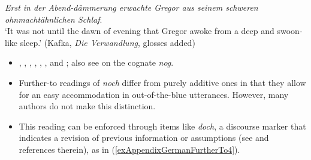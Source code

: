 \begin{exe}
	\exi{}
	\textit{Erst in der Abend-dämmerung erwachte Gregor aus seinem schweren ohnmachtähnlichen Schlaf}.\\
\lq It was not until the dawn of evening that Gregor awoke from a deep and swoon-like sleep.' (Kafka, \textit{Die Verwandlung}, glosses added)
\end{exe}

\label{appendixGermanFurtherTo}
\begin{itemize}
	\sloppy
	\item \textcite{Beck2019}, \textcite[s.v. \textit{noch}]{Duden}, \textcite{Klein2018}, \textcite[176]{KoenigEtAl1993}, \textcite{Nederstigt2003}, \textcite{Shetter1966}, \textcite{Umbach2012} and \textcite{Vaelikangas1982}; also see \textcite{Vandeweghe1984} on the  cognate \textit{nog}.
	\item Further-to readings of \textit{noch} differ from purely additive ones in that they allow for an easy accommodation in out-of-the-blue utterances. However, many authors do not make this distinction. 
	\item This reading can be enforced through items like \textit{doch}, a discourse marker that indicates a revision of previous information or assumptions (see \cite{RojasEsponda} and references therein), as in (\ref{exAppendixGermanFurtherTo4}).
\end{itemize}
